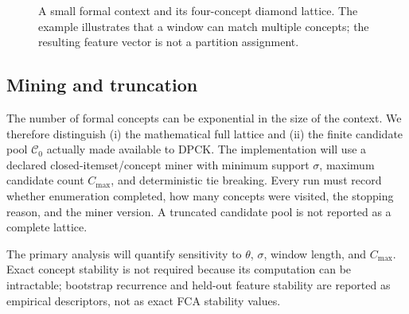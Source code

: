 \documentclass[a4paper,preprint,review,12pt,authoryear]{elsarticle}
\newcommand{\Ccal}{\mathcal{C}}
\begin{document}
\begin{figure}[H]
\centering
{}
\caption{A small formal context and its four-concept diamond lattice. The example illustrates that a window can match multiple concepts; the resulting feature vector is not a partition assignment.}
\label{fig:lattice}
\end{figure}

\subsection{Mining and truncation}

The number of formal concepts can be exponential in the size of the context. We therefore distinguish (i) the mathematical full lattice and (ii) the finite candidate pool $\Ccal_0$ actually made available to DPCK. The implementation will use a declared closed-itemset/concept miner with minimum support $\sigma$, maximum candidate count $C_{\max}$, and deterministic tie breaking. Every run must record whether enumeration completed, how many concepts were visited, the stopping reason, and the miner version. A truncated candidate pool is not reported as a complete lattice.

The primary analysis will quantify sensitivity to $\theta$, $\sigma$, window length, and $C_{\max}$. Exact concept stability is not required because its computation can be intractable; bootstrap recurrence and held-out feature stability are reported as empirical descriptors, not as exact FCA stability values.
\end{document}
